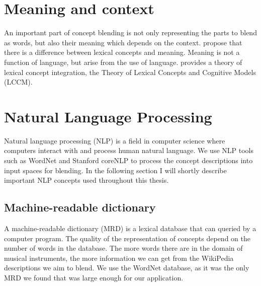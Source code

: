 

\section{Meaning and context}
An important part of concept blending is not only representing the parts to blend as words, but also their meaning which depends on the context. \parencite{Reference6} propose that there is a difference between lexical concepts and meaning. Meaning is not a function of language, but arise from the use of language. \parencite{Reference6} provides a theory of lexical concept integration, the Theory of Lexical Concepts and Cognitive Models (LCCM). 




\section{Natural Language Processing}
Natural language processing (NLP) is a field in computer science where computers interact with and process human natural language.
We use NLP tools such as WordNet and Stanford coreNLP to process the concept descriptions into input spaces for blending.
In the following section I will shortly describe important NLP concepts used throughout this thesis.

\subsection{Machine-readable dictionary}
A machine-readable dictionary (MRD) is a lexical database that can queried by a computer program.
The quality of the representation of concepts depend on the number of words in the database.
The more words there are in the domain of musical instruments, the more information we can get from the WikiPedia descriptions we aim to blend.
We use the WordNet database, as it was the only MRD we found that was large enough for our application. \parencite{fellbaum1998wordnet}

